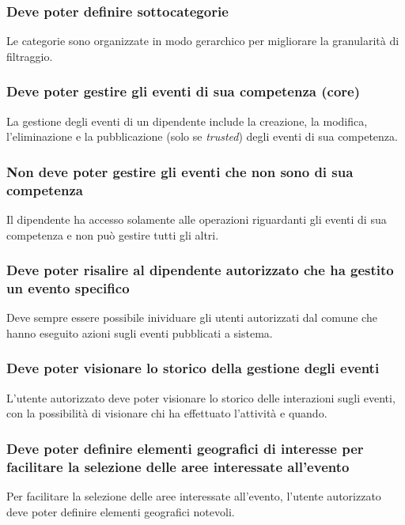 \documentclass{article}
\begin{document}
\subsubsection{Deve poter definire sottocategorie}
\label{5.3.1}
Le categorie sono organizzate in modo gerarchico per migliorare la granularità di filtraggio.

\subsubsection{Deve poter gestire gli eventi di sua competenza (core)}
\label{5.3.2}
La gestione degli eventi di un dipendente include la creazione, la modifica, l'eliminazione e la pubblicazione (solo se \textit{trusted}) degli eventi di sua competenza.

\subsubsection{Non deve poter gestire gli eventi che non sono di sua competenza}
\label{5.3.3}
Il dipendente ha accesso solamente alle operazioni riguardanti gli eventi di sua competenza e non può gestire tutti gli altri.

\subsubsection{Deve poter risalire al dipendente autorizzato che ha gestito un evento specifico}
\label{5.3.4}
Deve sempre essere possibile inividuare gli utenti autorizzati dal comune che hanno eseguito azioni sugli eventi pubblicati a sistema.

\subsubsection{Deve poter visionare lo storico della gestione degli eventi}
\label{5.3.5}
L'utente autorizzato deve poter visionare lo storico delle interazioni sugli eventi, con la possibilità di visionare chi ha effettuato l'attività e quando.

\subsubsection{Deve poter definire elementi geografici di interesse per facilitare la selezione delle aree interessate all'evento}
\label{5.3.6}
Per facilitare la selezione delle aree interessate all'evento, l'utente autorizzato deve poter definire elementi geografici notevoli.
\end{document}
